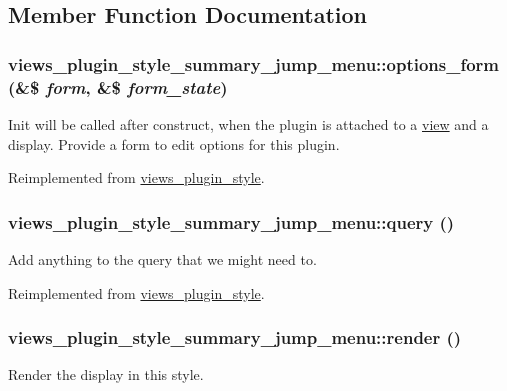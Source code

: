 \subsection{Member Function Documentation}
\hypertarget{classviews__plugin__style__summary__jump__menu_ab66730cfcd70ef23a0dbc05e80ad3d32}{
\subsubsection[{options\_\-form}]{\setlength{\rightskip}{0pt plus 5cm}views\_\-plugin\_\-style\_\-summary\_\-jump\_\-menu::options\_\-form (\&\$ {\em form}, \/  \&\$ {\em form\_\-state})}}
\label{classviews__plugin__style__summary__jump__menu_ab66730cfcd70ef23a0dbc05e80ad3d32}
Init will be called after construct, when the plugin is attached to a \hyperlink{classview}{view} and a display. Provide a form to edit options for this plugin. 

Reimplemented from \hyperlink{classviews__plugin__style_afe3d437ff4398315b15c4e60975dbb1c}{views\_\-plugin\_\-style}.\hypertarget{classviews__plugin__style__summary__jump__menu_aee2a45ee02a7ce8d041a5b028758cf0b}{
\subsubsection[{query}]{\setlength{\rightskip}{0pt plus 5cm}views\_\-plugin\_\-style\_\-summary\_\-jump\_\-menu::query ()}}
\label{classviews__plugin__style__summary__jump__menu_aee2a45ee02a7ce8d041a5b028758cf0b}
Add anything to the query that we might need to. 

Reimplemented from \hyperlink{classviews__plugin__style_af6b601d8f42cc3d86721fcad76eaae4b}{views\_\-plugin\_\-style}.\hypertarget{classviews__plugin__style__summary__jump__menu_a7e9b8b44735067dc7ebb838e54a21a38}{
\subsubsection[{render}]{\setlength{\rightskip}{0pt plus 5cm}views\_\-plugin\_\-style\_\-summary\_\-jump\_\-menu::render ()}}
\label{classviews__plugin__style__summary__jump__menu_a7e9b8b44735067dc7ebb838e54a21a38}
Render the display in this style. 

